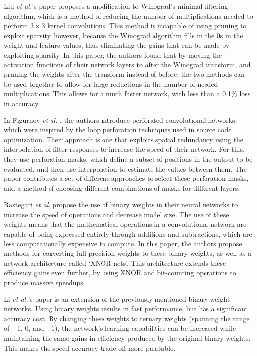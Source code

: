 \documentclass[11pt,a4paper,oldfontcommands]{memoir}
\begin{document}
Liu \textit{et al.}'s paper \cite{Winograd} proposes a modification to Winograd's minimal filtering algorithm, which is a method of reducing the number of multiplications needed to perform $3 \times 3$ kernel convolutions. This method is incapable of using pruning to exploit sparsity, however, because the Winograd algorithm fills in the 0s in the weight and feature values, thus eliminating the gains that can be made by exploiting sparsity. In this paper, the authors found that by moving the activation functions of their network layers to after the Winograd transform, and pruning the weights after the transform instead of before, the two methods can be used together to allow for large reductions in the number of needed multiplications. This allows for a much faster network, with less than a 0.1\% loss in accuracy.  

In Figurnov \textit{et al.} \cite{PerfCNN}, the authors introduce perforated convolutional networks, which were inspired by the loop perforation techniques used in source code optimization. Their approach is one that exploits spatial redundancy using the interpolation of filter responses to increase the speed of their network. For this, they use perforation masks, which define a subset of positions in the output to be evaluated, and then use interpolation to estimate the values between them. The paper contributes a set of different approaches to select these perforation masks, and a method of choosing different combinations of masks for different layers.

Rastegari \textit{et al.} \cite{binary} propose the use of binary weights in their neural networks to increase the speed of operations and decrease model size. The use of these weights means that the mathematical operations in a convolutional network are capable of being expressed entirely through additions and subtractions, which are less computationally expensive to compute. In this paper, the authors propose methods for converting full precision weights to these binary weights, as well as a network architecture called `XNOR-nets'. This architecture extends these efficiency gains even further, by using XNOR and bit-counting operations to produce massive speedups.

Li \textit{et al.}'s paper \cite{ternary} is an extension of the previously mentioned binary weight networks. Using binary weights results in fast performance, but has a significant accuracy cost. By changing these weights to ternary weights (spanning the range of $-1$, 0, and $+1$), the network's learning capabilities can be increased while maintaining the same gains in efficiency produced by the original binary weights. This makes the speed-accuracy trade-off more palatable. 
\end{document}
